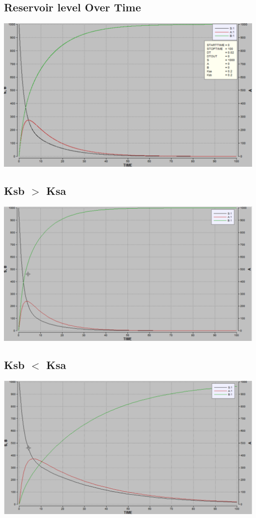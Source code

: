 \documentclass [12pt] {article}
\begin{document}
\subsection{Reservoir level Over Time}
\includegraphics[scale=0.7]{SAB_vs_Time.PNG}

\subsection{Ksb $>$  Ksa}
\includegraphics[scale=0.7]{ksb_greater_ksa.PNG}

\subsection{Ksb $<$ Ksa}
\includegraphics[scale=0.7]{ksb_less_ksa.PNG}
\end{document}

